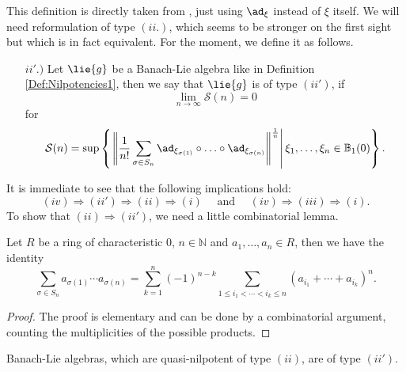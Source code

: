 \documentclass[
11pt,                          %
english                        %
]{article}
\begin{document}
This definition is directly taken from \cite{mueller}, just using $\ad_\xi$ instead 
of $\xi$ itself. We will need reformulation of type $(ii.)$, which seems to be 
stronger on the first sight but which is in fact equivalent. For the moment, we 
define it as follows.
\begin{itemize}
	\item[$ii'.)$]
	Let $\lie{g}$ be a Banach-Lie algebra like in Definition 
	\ref{Def:Nilpotencies1}, then we say that $\lie{g}$ is of type $(ii')$, if
	\begin{equation*}
		\lim_{n \longrightarrow \infty}
		\mathcal{S}(n)
		=
		0
	\end{equation*}
	for
	\begin{equation}
		\mathcal{S}(n)
		=
		\sup \left\{ 
		\left.
			\left\Vert
				\frac{1}{n!}
				\sum\limits_{\sigma \in S_n}
				\ad_{\xi_{\sigma(1)}} \circ \ldots \circ \ad_{\xi_{\sigma(n)}}
			\right\Vert^{\frac{1}{n}} 
		\right|
			\xi_1, \ldots, \xi_n \in \mathbb{B}_1(0)
		\right\}.
	\end{equation}
\end{itemize}
It is immediate to see that the following implications hold:
\begin{equation*}
	(iv) \Longrightarrow 
	(ii') \Longrightarrow 
	(ii) \Longrightarrow 
	(i)
	\quad \text{ and } \quad
	(iv) \Longrightarrow
	(iii) \Longrightarrow 
	(i).
\end{equation*}
To show that $(ii) \Longrightarrow (ii')$, we need a little combinatorial lemma.
\begin{lemma}
	\label{lemma:symmetric-to-power}
	Let $R$ be a ring of characteristic $0$, $n\in \mathbb{N}$ and $a_1, 
	\ldots, a_n \in R$, then we have the identity
	\begin{equation*}
		\sum\limits_{\sigma \in S_n}
		a_{\sigma(1)} \cdots a_{\sigma(n)}
		=
		\sum\limits_{k = 1}^n
		(-1)^{n-k}
		\sum\limits_{1 \leq i_1 < \cdots < i_k \leq n}
		(a_{i_1} + \cdots + a_{i_k})^n.
	\end{equation*}
\end{lemma}
\begin{proof}
	The proof is elementary and can be done by a combinatorial argument, counting 
	the multiplicities of the possible products.
\end{proof}
\begin{proposition}
	\label{prop:type-2-is-2prime}
	Banach-Lie algebras, which are quasi-nilpotent of type $(ii)$, are of type 
	$(ii')$.
\end{proposition}
\end{document}
